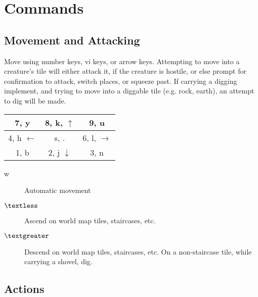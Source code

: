 \section{Commands}

\subsection{Movement and Attacking}

Move using number keys, vi keys, or arrow keys.  Attempting to move into a
creature's tile will either attack it, if the creature is hostile, or
else prompt for confirmation to attack, switch places, or squeeze past.
If carrying a digging implement, and trying to move into a diggable tile
(e.g. rock, earth), an attempt to dig will be made.

\begin{center}
\begin{tabular}{|c|c|c|}
\hline
7, y & 8, k, $\uparrow$ & 9, u \\
\hline
4, h $\leftarrow$ & s, . & 6, l, $\rightarrow$ \\
\hline
1, b & 2, j $\downarrow$ & 3, n \\
\hline
\end{tabular}
\end{center}

\begin{description}
\item[w]
Automatic movement
\item[$\textless$] 
Ascend on world map tiles, staircases, etc.
\item[$\textgreater$] 
Descend on world map tiles, staircases, etc.  On a non-staircase tile,
while carrying a shovel, dig.
\end{description}

\subsection{Actions}

